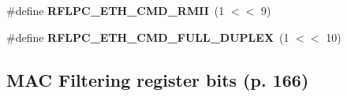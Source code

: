 \begin{DoxyCompactItemize}
\item 
\hypertarget{group__eth_gab62cdca2e9fd8933223ea8d5cb7ffc6f}{\#define {\bfseries R\-F\-L\-P\-C\-\_\-\-E\-T\-H\-\_\-\-C\-M\-D\-\_\-\-R\-M\-I\-I}~(1 $<$$<$ 9)}\label{group__eth_gab62cdca2e9fd8933223ea8d5cb7ffc6f}

\item 
\hypertarget{group__eth_gaae69123d1fb4025ab21aa2140644fbf9}{\#define {\bfseries R\-F\-L\-P\-C\-\_\-\-E\-T\-H\-\_\-\-C\-M\-D\-\_\-\-F\-U\-L\-L\-\_\-\-D\-U\-P\-L\-E\-X}~(1 $<$$<$ 10)}\label{group__eth_gaae69123d1fb4025ab21aa2140644fbf9}

\end{DoxyCompactItemize}
\subsection*{M\-A\-C Filtering register bits (p. 166)}
